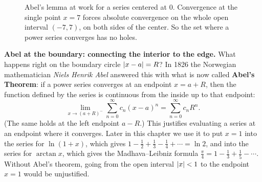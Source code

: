 \begin{figure}[htbp]
\centering
{}
\caption{Abel's lemma at work for a series centered at $0$. Convergence at the single point $x=7$ forces absolute convergence on the whole open interval $(-7,7)$, on both sides of the center. So the set where a power series converges has no holes.}
\label{ch30:fig-abel}
\end{figure}

\begin{connectionbox}
\textbf{Abel at the boundary: connecting the interior to the edge.}
What happens right on the boundary circle $\lvert x-a\rvert = R$?
In 1826 the Norwegian mathematician \emph{Niels Henrik Abel} answered this with what is now called \textbf{Abel's Theorem}: if a power series converges at an endpoint $x = a + R$, then the function defined by the series is continuous from the inside up to that endpoint:
\[
  \lim_{x \to (a+R)^-} \sum_{n=0}^{\infty} c_n (x-a)^n = \sum_{n=0}^{\infty} c_n R^n.
\]
(The same holds at the left endpoint $a-R$.) This justifies evaluating a series at an endpoint where it converges. Later in this chapter we use it to put $x = 1$ into the series for $\ln(1+x)$, which gives $1 - \frac12 + \frac13 - \frac14 + \cdots = \ln 2$, and into the series for $\arctan x$, which gives the Madhava--Leibniz formula $\frac{\pi}{4} = 1 - \frac13 + \frac15 - \cdots$. Without Abel's theorem, going from the open interval $\lvert x\rvert < 1$ to the endpoint $x = 1$ would be unjustified.
\end{connectionbox}

